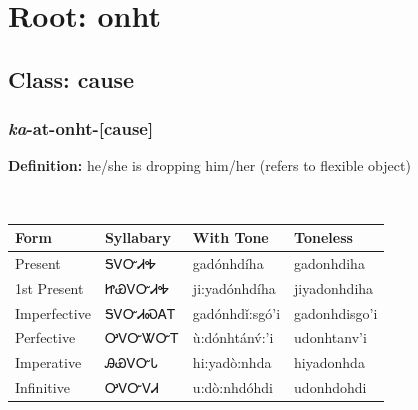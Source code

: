 \needspace{4in}
\section*{Root: onht}
\nopagebreak
{}
\needspace{3in}
\subsection*{Class: cause}
\nopagebreak
\needspace{2in}
\subsubsection*{\textit{ka}{-}at{-}\textbf{onht}{-}[cause]}
\nopagebreak
\textbf{Definition: } he/she is dropping him/her (refers to flexible object)
\\[0.5em]
\begin{tabularx}{\textwidth}{l X X X}%
\toprule%
\textbf{Form}&\textbf{Syllabary}&\textbf{With Tone}&\textbf{Toneless}\\%
\midrule%
Present&ᎦᏙᏅᏗᎭ&gadónhdíha&gadonhdiha\\%
1st Present&ᏥᏯᏙᏅᏗᎭ&ji:yadónhdíha&jiyadonhdiha\\%
Imperfective&ᎦᏙᏅᏗᏍᎪᎢ&gadónhdǐ:sgó’i&gadonhdisgo’i\\%
Perfective&ᎤᏙᏅᏔᏅᎢ&ù:dónhtánv́:’i&udonhtanv’i\\%
Imperative&ᎯᏯᏙᏅᏓ&hi:yadò:nhda&hiyadonhda\\%
Infinitive&ᎤᏙᏅᏙᏗ&u:dò:nhdóhdi&udonhdohdi\\%
\bottomrule%
\end{tabularx}
\\[1em]